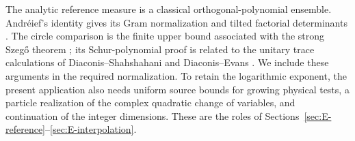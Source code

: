 The analytic reference measure is a classical orthogonal-polynomial
ensemble. Andr\'eief's identity gives its Gram normalization and
tilted factorial determinants \cite{TracyWidom1998}. The circle
comparison is the finite upper bound associated with the strong
Szeg\H{o} theorem \cite{Simon2005Szego}; its Schur-polynomial proof
is related to the unitary trace calculations of Diaconis--Shahshahani
and Diaconis--Evans \cite{DiaconisShahshahani1994,DiaconisEvans2001}.
We include these arguments in the required
normalization. To retain the logarithmic exponent, the present
application also needs uniform source bounds for growing physical
tests, a particle realization of the complex quadratic change of
variables, and continuation of the integer dimensions. These are
the roles of Sections~\ref{sec:E-reference}--\ref{sec:E-interpolation}.
